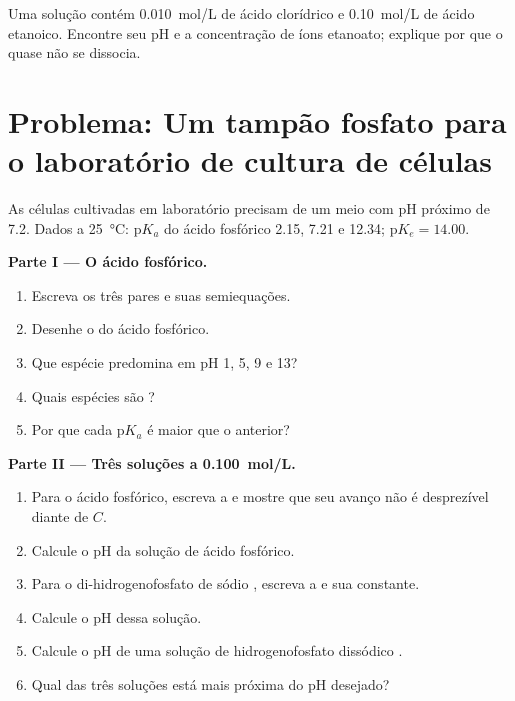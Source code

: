 \begin{exercise}[$\star\star\star$]\label{exo:b1:predominant-reaction:12}
Uma solução contém \qty{0.010}{mol/L} de ácido clorídrico e
\qty{0.10}{mol/L} de ácido etanoico. Encontre seu pH e a concentração de
íons etanoato; explique por que o  quase não se dissocia.
\end{exercise}

\section{Problema: Um tampão fosfato para o laboratório de cultura de células}

\begin{problem}
\label{pb:b1:predominant-reaction:1}
As células cultivadas em laboratório precisam de um meio com pH próximo
de 7.2. Dados a \qty{25}{\celsius}: $\mathrm{p}K_a$ do ácido fosfórico
2.15, 7.21 e
12.34; $\mathrm{p}K_e = 14.00$.

\medskip
\noindent\textbf{Parte I --- O ácido fosfórico.}
\begin{enumerate}
  \item Escreva os três pares e suas semiequações.
  \item Desenhe o  do ácido fosfórico.
  \item Que espécie predomina em pH 1, 5, 9 e 13?
  \item Quais espécies são ?
  \item Por que cada $\mathrm{p}K_a$ é maior que o anterior?
\end{enumerate}

\medskip
\noindent\textbf{Parte II --- Três soluções a \qty{0.100}{mol/L}.}
\begin{enumerate}[resume]
  \item Para o ácido fosfórico, escreva a  e mostre que
        seu avanço não é desprezível diante de $C$.
  \item Calcule o pH da solução de ácido fosfórico.
  \item Para o di-hidrogenofosfato de sódio , escreva a  e sua constante.
  \item Calcule o pH dessa solução.
  \item Calcule o pH de uma solução de hidrogenofosfato dissódico
        .
  \item Qual das três soluções está mais próxima do pH desejado?
\end{enumerate}


\end{problem}
